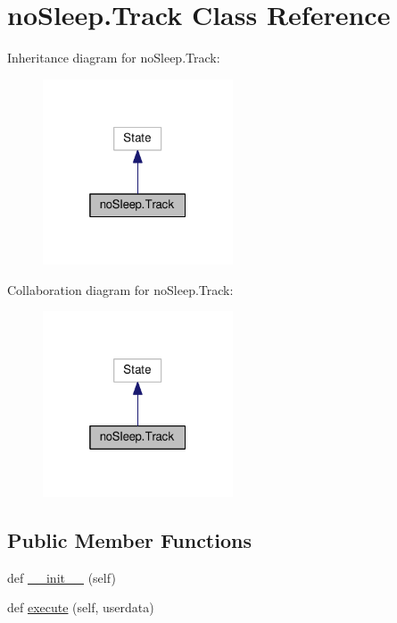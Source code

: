 \hypertarget{classnoSleep_1_1Track}{}\section{no\+Sleep.\+Track Class Reference}
\label{classnoSleep_1_1Track}


Inheritance diagram for no\+Sleep.\+Track\+:
\nopagebreak
\begin{figure}[H]
\begin{center}
\leavevmode
\includegraphics[width=160pt]{classnoSleep_1_1Track__inherit__graph}
\end{center}
\end{figure}


Collaboration diagram for no\+Sleep.\+Track\+:
\nopagebreak
\begin{figure}[H]
\begin{center}
\leavevmode
\includegraphics[width=160pt]{classnoSleep_1_1Track__coll__graph}
\end{center}
\end{figure}
\subsection*{Public Member Functions}
\begin{DoxyCompactItemize}
\item 
def \hyperlink{classnoSleep_1_1Track_a9af26ff426231cb9c1bc6e5395cf6ec5}{\+\_\+\+\_\+init\+\_\+\+\_\+} (self)
\item 
def \hyperlink{classnoSleep_1_1Track_aa6bbc699fd4253fec111652d41221990}{execute} (self, userdata)
\end{DoxyCompactItemize}

